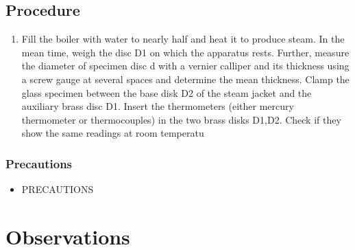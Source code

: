 \documentclass[%
 sor,
 jor,
 amsmath,amssymb,
 reprint,
]{revtex4-2}
\begin{document}
\subsection{Procedure}
\begin{enumerate}
\item Fill the boiler with water to nearly half and heat it to produce steam. In the mean time, weigh the disc D1 on which the apparatus rests. Further, measure the diameter of specimen disc d with a vernier calliper and its thickness using a screw gauge at several spaces and determine the mean thickness. Clamp the glass specimen between the base disk D2 of the steam jacket and the auxiliary brass disc D1. Insert the thermometers (either mercury thermometer or thermocouples) in the two brass disks D1,D2. Check if they show the same readings at room temperatu%

\end{enumerate}
\subsubsection{Precautions}
\begin{itemize}
\item PRECAUTIONS
\end{itemize}
\section{Observations}
\end{document}
